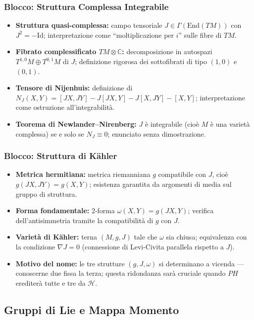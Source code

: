 \documentclass[12pt, a4paper]{article}
\begin{document}
	\subsubsection{Blocco: Struttura Complessa Integrabile}
	\begin{itemize}
		\item \textbf{Struttura quasi-complessa:} campo tensoriale $J \in \Gamma(\text{End}(TM))$ con $J^2 = -\text{Id}$; interpretazione come ``moltiplicazione per $i$'' sulle fibre di $TM$.
		\item \textbf{Fibrato complessificato $TM \otimes \mathbb{C}$:} decomposizione in autospazi $T^{1,0}M \oplus T^{0,1}M$ di $J$; definizione rigorosa dei sottofibrati di tipo $(1,0)$ e $(0,1)$.
		\item \textbf{Tensore di Nijenhuis:} definizione di $N_J(X,Y) = [JX,JY] - J[JX,Y] - J[X,JY] - [X,Y]$; interpretazione come ostruzione all'integrabilità.
		\item \textbf{Teorema di Newlander--Nirenberg:} $J$ è integrabile (cioè $M$ è una varietà complessa) se e solo se $N_J \equiv 0$; enunciato senza dimostrazione.
	\end{itemize}
	
	\subsubsection{Blocco: Struttura di Kähler}
	\begin{itemize}
		\item \textbf{Metrica hermitiana:} metrica riemanniana $g$ compatibile con $J$, cioè $g(JX,JY) = g(X,Y)$; esistenza garantita da argomenti di media sul gruppo di struttura.
		\item \textbf{Forma fondamentale:} 2-forma $\omega(X,Y) = g(JX,Y)$; verifica dell'antisimmetria tramite la compatibilità di $g$ con $J$.
		\item \textbf{Varietà di Kähler:} terna $(M, g, J)$ tale che $\omega$ sia chiusa; equivalenza con la condizione $\nabla J = 0$ (connessione di Levi-Civita parallela rispetto a $J$).
		\item \textbf{Motivo del nome:} le tre strutture $(g, J, \omega)$ si determinano a vicenda --- conoscerne due fissa la terza; questa ridondanza sarà cruciale quando $PH$ erediterà tutte e tre da $\mathcal{H}$.
	\end{itemize}
	
	\subsection{Gruppi di Lie e Mappa Momento}
	
\end{document}
